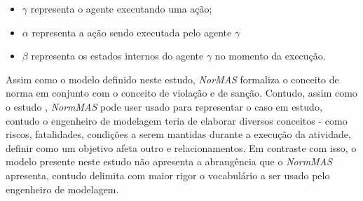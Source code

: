 \documentclass[12pt]{article}
\begin{document}
\begin{itemize}
    \item $\gamma$ representa o agente executando uma ação;
    \item $\alpha$ representa a ação sendo executada pelo agente $\gamma$
    \item $\beta$ representa os estados internos do agente $\gamma$ no momento da execução.
\end{itemize}

Assim como o modelo definido neste estudo, \textit{NorMAS} formaliza o conceito de norma em conjunto com o conceito de violação e de sanção. Contudo, assim como o estudo \cite{dastaniNormativeMultiAgentProgram}, \textit{NormMAS} pode user usado para representar o caso em estudo, contudo o engenheiro de modelagem teria de elaborar diversos conceitos - como riscos, fatalidades, condições a serem mantidas durante a execução da atividade, definir como um objetivo afeta outro e relacionamentos. Em contraste com isso, o modelo presente neste estudo não apresenta a abrangência que o \textit{NormMAS} apresenta, contudo delimita com maior rigor o vocabulário a ser usado pelo engenheiro de modelagem.



\end{document}
